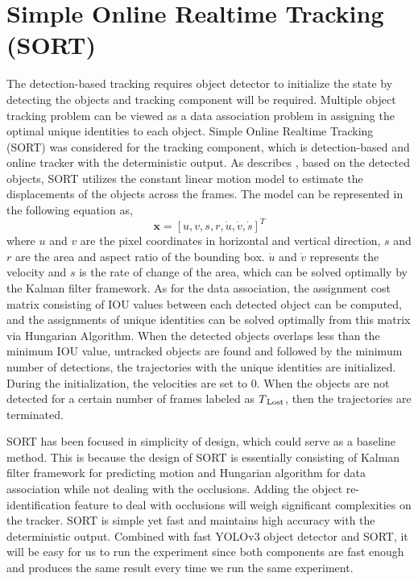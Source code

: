 \section{Simple Online Realtime Tracking (SORT)}
\label{sec:background/section_b}

The detection-based tracking requires object detector to initialize the state by detecting the objects and tracking component will be required. Multiple object tracking problem can be viewed as a data association problem in assigning the optimal unique identities to each object. Simple Online Realtime Tracking (SORT) was considered for the tracking component, which is detection-based and online tracker with the deterministic output. As \citeauthor{bewley_simple_2016} describes \cite{bewley_simple_2016}, based on the detected objects, SORT utilizes the constant linear motion model to estimate the displacements of the objects across the frames. The model can be represented in the following equation as,
\begin{equation}
\textbf{x} = [u, v, s, r, \dot{u}, \dot{v}, \dot{s}]^T
\label{eq:SORT_model}
\end{equation}
where $u$ and $v$ are the pixel coordinates in horizontal and vertical direction, $s$ and $r$ are the area and aspect ratio of the bounding box. $\dot{u}$ and $\dot{v}$ represents the velocity and $s$ is the rate of change of the area, which can be solved optimally by the Kalman filter framework. As for the data association, the assignment cost matrix consisting of IOU values between each detected object can be computed, and the assignments of unique identities can be solved optimally from this matrix via Hungarian Algorithm. When the detected objects overlaps less than the minimum IOU value, untracked objects are found and followed by the minimum number of detections, the trajectories with the unique identities are initialized. During the initialization, the velocities are set to 0. When the objects are not detected for a certain number of frames labeled as $T\textsubscript{Lost}$, then the trajectories are terminated.

SORT has been focused in simplicity of design, which could serve as a baseline method. This is because the design of SORT is essentially consisting of Kalman filter framework for predicting motion and Hungarian algorithm for data association while not dealing with the occlusions. Adding the object re-identification feature to deal with occlusions will weigh significant complexities on the tracker. SORT is simple yet fast and maintains high accuracy with the deterministic output. Combined with fast YOLOv3 object detector and SORT, it will be easy for us to run the experiment since both components are fast enough and produces the same result every time we run the same experiment.